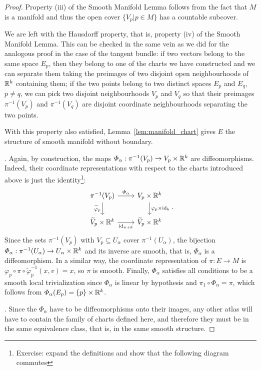 \begin{proof}
	Property (iii) of the Smooth Manifold Lemma follows from the fact that $M$ is a manifold and thus the open cover $\{V_p | p \in M\}$ has a countable subcover.

	We are left with the Hausdorff property, that is, property (iv) of the Smooth Manifold Lemma.
	This can be checked in the same vein as we did for the analogous proof in the case of the tangent bundle:
	if two vectors belong to the same space $E_p$, then they belong to one of the charts we have constructed and we can separate them taking the preimages of two disjoint open neighbourhoods of $\mathbb{R}^k$ containing them; if the two points belong to two distinct spaces $E_p$ and $E_q$, $p\neq q$, we can pick two disjoint neighbourhoods $V_p$ and $V_q$ so that their preimages $\pi^{-1}(V_p)$ and $\pi^{-1}(V_q)$ are disjoint coordinate neighbourhoods separating the two points.

	With this property also satisfied, Lemma~\ref{lem:manifold_chart} gives $E$ the structure of smooth manifold without boundary.

	.
	Again, by construction, the maps $\varPhi_\alpha : \pi^{-1}(V_p) \to V_p\times\mathbb{R}^k$ are diffeomorphisms.
	Indeed, their coordinate representations with respect to the charts introduced above is just the identity\footnote{Exercise: expand the definitions and show that the following diagram commutes}:
	\begin{equation}
		\begin{tikzcd}
			{\pi^{-1}(V_p)} & {V_p\times\R^k} \\
			{\widetilde{V}_p\times\R^k} & {\widetilde{V}_p\times\R^k}
			\arrow["{\varPhi_\alpha}", from=1-1, to=1-2]
			\arrow["{\varphi_p\times\id_k}", from=1-2, to=2-2]
			\arrow["{\widetilde{\varphi}_p}"', from=1-1, to=2-1]
			\arrow["{\id_{n+k}}"', from=2-1, to=2-2]
		\end{tikzcd}.
	\end{equation}
	Since the sets $\pi^{-1}(V_p)$ with $V_p\subseteq U_\alpha$ cover $\pi^{-1}(U_\alpha)$, the bijection $\varPhi_\alpha:\pi^{-1}(U_\alpha)\to U_\alpha\times\mathbb{R}^k$ and its inverse are smooth, that is, $\varPhi_\alpha$ is a diffeomorphism.
	In a similar way, the coordinate representation of $\pi : E \to M$ is $\varphi_p \circ \pi \circ \widetilde{\varphi}_p^{-1} (x,v) = x$, so $\pi$ is smooth.
	Finally, $\Phi_\alpha$ satisfies all conditions to be a smooth local trivialization since $\varPhi_\alpha$ is linear by hypothesis and $\pi_1 \circ \varPhi_\alpha = \pi$, which follows from $\varPhi_\alpha(E_p) = \{p\}\times \mathbb{R}^k$.

	.
	Since the $\varPhi_\alpha$ have to be diffeomorphisms onto their images, any other atlas will have to contain the family of charts defined here, and therefore they must be in the same equivalence class, that is, in the same smooth structure.
\end{proof}

